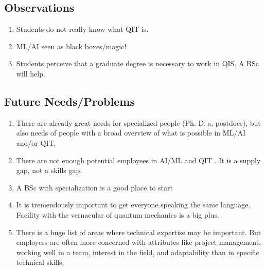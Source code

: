 \documentclass[%
oneside,                 %
final,                   %
10pt]{article}
\begin{document}
\noindent
\subsection{Observations}

\begin{enumerate}
\item Students do not really know what QIT is.

\item ML/AI seen as black boxes/magic!

\item Students perceive that a graduate degree is necessary to work in QIS. A BSc will help.
\end{enumerate}

\noindent
\subsection{Future Needs/Problems}

\begin{enumerate}
\item There are already  great needs for specialized people (Ph. D. s, postdocs), but also needs of  people with a broad overview of what is possible in ML/AI and/or QIT.

\item There are not enough potential employees in AI/ML and QIT . It is a supply gap, not a skills gap.

\item A BSc with specialization  is a good place to start

\item It is tremendously important to get everyone speaking the same language. Facility with the vernacular of quantum mechanics is a big plus.

\item There is a huge list of areas where technical expertise may be important. But employers are often more concerned with attributes like project management, working well in a team, interest in the field, and adaptability than in specific technical skills.
\end{enumerate}

\noindent


\end{document}
